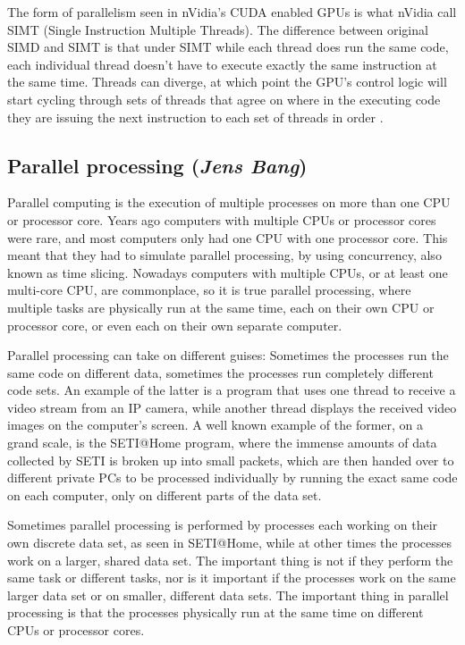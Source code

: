 The form of parallelism seen in nVidia's CUDA enabled GPUs is what nVidia call SIMT (Single Instruction Multiple Threads). The difference between original SIMD and SIMT is that under SIMT while each thread does run the same code, each individual thread doesn't have to execute exactly the same instruction at the same time. Threads can diverge, at which point the GPU's control logic will start cycling through sets of threads that agree on where in the executing code they are issuing the next instruction to each set of threads in order \cite[p.~81-82]{programmingguide}. 

\subsection{Parallel processing (\textit{Jens Bang})}

Parallel computing is the execution of multiple processes on more than one CPU or processor core. Years ago computers with multiple CPUs or processor cores were rare, and most computers only had one CPU with one processor core. This meant that they had to simulate parallel processing, by using concurrency, also known as time slicing. Nowadays computers with multiple CPUs, or at least one multi-core CPU, are commonplace, so it is true parallel processing, where multiple tasks are physically run at the same time, each on their own CPU or processor core, or even each on their own separate computer.

Parallel processing can take on different guises: Sometimes the processes run the same code on different data, sometimes the processes run completely different code sets. An example of the latter is a program that uses one thread to receive a video stream from an IP camera, while another thread displays the received video images on the computer's screen. A well known example of the former, on a grand scale, is the SETI@Home program, where the immense amounts of data collected by SETI is broken up into small packets, which are then handed over to different private PCs to be processed individually by running the exact same code on each computer, only on different parts of the data set.

Sometimes parallel processing is performed by processes each working on their own discrete data set, as seen in SETI@Home, while at other times the processes work on a larger, shared data set. The important thing is not if they perform the same task or different tasks, nor is it important if the processes work on the same larger data set or on smaller, different data sets. The important thing in parallel processing is that the processes physically run at the same time on different CPUs or processor cores.

